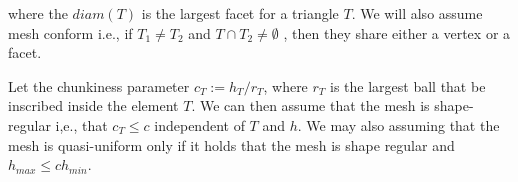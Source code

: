 where the $diam( T )$ is the largest facet for a triangle $T$. We will also assume mesh conform i.e., if $T_{1} \neq T_{2 }$  and $T \cap T_{2} \neq \emptyset  $ , then they share either a vertex or a facet.

Let the chunkiness parameter $c_{T} := h_{T}/r_{T}$, where $r_{T}$  is the largest ball that be inscribed inside the element $T$. We can then assume that the mesh is shape-regular i,e., that $c_{T}\le  c$ independent of $T$  and $h$. We may also assuming that
the mesh is quasi-uniform only if it holds that the mesh is shape regular and $h_{max} \le  c h_{min}$.





